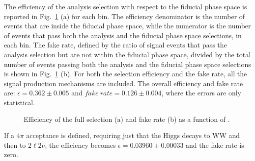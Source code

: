 The efficiency of the analysis selection with respect to the fiducial phase space is reported in Fig.~\ref{fig:sel_eff} (a) for each \pth bin. The efficiency denominator is the number of events that are inside the fiducial phase space, while the numerator is the number of events that pass both the analysis and the fiducial phase space selections, in each \pth bin. The fake rate, defined by the ratio of signal events that pass the analysis selection but are not within the fiducial phase space, divided by the total number of events passing both the analysis and the fiducial phase space selections is shown in Fig.~\ref{fig:sel_eff} (b). For both the selection efficiency and the fake rate, all the signal production mechanisms are included.
The overall efficiency and fake rate are: $\epsilon=0.362\pm{0.005}$ and $fake~rate=0.126\pm0.004$, where the errors are only statistical.

\begin{figure}[t]
\centering
{}
\caption{Efficiency of the full selection (a) and fake rate (b) as a function of \pth.\label{fig:sel_eff}}
\end{figure}


If a $4\pi$ acceptance is defined, requiring just that the Higgs decays to WW and then to $2\ell2\nu$, the efficiency becomes $\epsilon=0.03960\pm{0.00033}$ and the fake rate is zero. 





